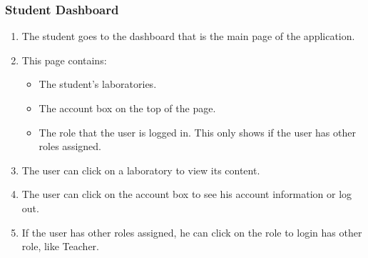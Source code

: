 \subsubsection{Student Dashboard}

\begin{enumerate}
    \item The student goes to the dashboard that is the main page of the application.
    \item This page contains:
    \begin{itemize}
        \item The student's laboratories.
        \item The account box on the top of the page.
        \item The role that the user is logged in. This only shows if the user has other roles assigned.
    \end{itemize}
    \item The user can click on a laboratory to view its content.
    \item The user can click on the account box to see his account information or log out.
    \item If the user has other roles assigned, he can click on the role to login has other role, like Teacher.
\end{enumerate}
